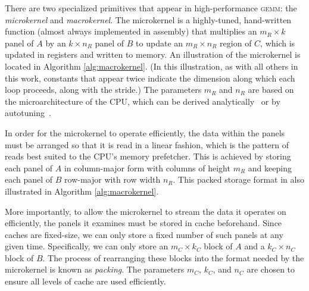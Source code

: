 \documentclass[12pt]{article}
\newcommand*{\TO}{\textbf{to}}
\newcommand*{\pluseq}{\mathrel{{+}{=}}}
\newcommand*{\gemm}{{\textsc{gemm}}}
\newcommand*{\mycite}[1]{~\cite{#1}}
\begin{document}
There are two specialized primitives that appear in high-performance \gemm{}: the \emph{microkernel} and \emph{macrokernel}.
The microkernel is a highly-tuned, hand-written function (almost always implemented in assembly) that multiplies an $m_R \times k$ panel of $A$ by an $k \times n_R$ panel of $B$ to update an $m_R \times n_R$ region of $C$, which is updated in registers and written to memory.
An illustration of the microkernel is located in Algorithm \ref{alg:macrokernel}.
(In this illustration, as with all others in this work, constants that appear twice indicate the dimension along which each loop proceeds, along with the stride.)
The parameters $m_R$ and $n_R$ are based on the microarchitecture of the CPU, which can be derived analytically\mycite{Low2016} or by autotuning\mycite{Whaley1998}.

\begin{algorithm}
  \caption{The macrokernel of a high-performance \gemm{} implementation.}
  \label{alg:macrokernel}
  \begin{tikzpicture}
    
  \end{tikzpicture}
  \begin{algorithmic}
    \For{$j \gets 0, n_R, \ldots$ \TO{} $n_C$}
    \For{$i \gets 0, m_R, \ldots$ \TO{} $m_C$}
    \State{$C'[i:i + m_R, j:j + n_R] \pluseq \widetilde{A}[i:i+m_R,:] \cdot \widetilde{B}[:,j:j+n_R]$}
    \EndFor{}
    \EndFor{}
    \EndProcedure{}
  \end{algorithmic}
\end{algorithm}

In order for the microkernel to operate efficiently, the data within the panels must be arranged so that it is read in a linear fashion, which is the pattern of reads best suited to the CPU's memory prefetcher.
This is achieved by storing each panel of $A$ in column-major form with columns of height $m_R$ and keeping each panel of $B$ row-major with row width $n_R$.
This packed storage format in also illustrated in Algorithm \ref{alg:macrokernel}.

More importantly, to allow the microkernel to stream the data it operates on efficiently, the panels it examines must be stored in cache beforehand.
Since caches are fixed-size, we can only store a fixed number of such panels at any given time.
Specifically, we can only store an $m_C \times k_C$ block of $A$ and a $k_C \times n_C$ block of $B$.
The process of rearranging these blocks into the format needed by the microkernel is known as \emph{packing}.
The parameters $m_C$, $k_C$, and $n_C$ are chosen to ensure all levels of cache are used efficiently.
\end{document}
